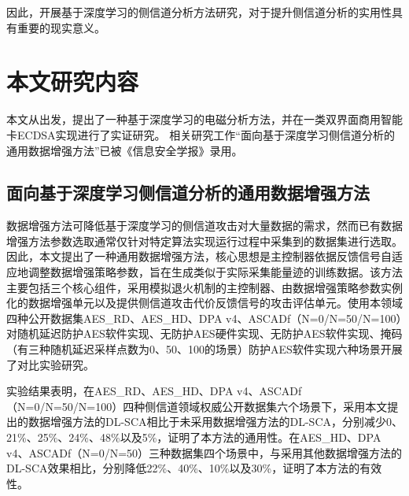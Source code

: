 {	因此，开展基于深度学习的侧信道分析方法研究，对于提升侧信道分析的实用性具有重要的现实意义。
	\section{本文研究内容}
	本文从\jiaodu 出发，提出了一种基于深度学习的电磁分析方法，并在一类双界面商用智能卡ECDSA实现进行了实证研究。%
	\ifshowcontent 相关研究工作“面向基于深度学习侧信道分析的通用数据增强方法”已被《信息安全学报》录用。\fi
	\subsection{面向基于深度学习侧信道分析的通用数据增强方法}
	数据增强方法可降低基于深度学习的侧信道攻击对大量数据的需求，然而已有数据增强方法参数选取通常仅针对特定算法实现运行过程中采集到的数据集进行选取。
	因此，本文提出了一种通用数据增强方法，核心思想是主控制器依据反馈信号自适应地调整数据增强策略参数，旨在生成类似于实际采集能量迹的训练数据。该方法主要包括三个核心组件，采用模拟退火机制的主控制器、由数据增强策略参数实例化的数据增强单元以及提供侧信道攻击代价反馈信号的攻击评估单元。使用本领域四种公开数据集AES\_RD、AES\_HD、DPA v4、ASCADf（N=0/N=50/N=100）对随机延迟防护AES软件实现、无防护AES硬件实现、无防护AES软件实现、掩码（有三种随机延迟采样点数为0、50、100的场景）防护AES软件实现六种场景开展了对比实验研究。
	
	实验结果表明，在AES\_RD、AES\_HD、DPA v4、ASCADf（N=0/N=50/N=100）四种侧信道领域权威公开数据集六个场景下，采用本文提出的数据增强方法的DL-SCA相比于未采用数据增强方法的DL-SCA，\chenggongtiaoshu 分别减少0、21\%、25\%、24\%、48\%以及5\%，证明了本方法的通用性。在AES\_HD、DPA v4、ASCADf（N=0/N=50）三种数据集四个场景中，与采用其他数据增强方法的DL-SCA效果相比，\chenggongtiaoshu 分别降低22\%、40\%、10\%以及30\%，证明了本方法的有效性。
}
